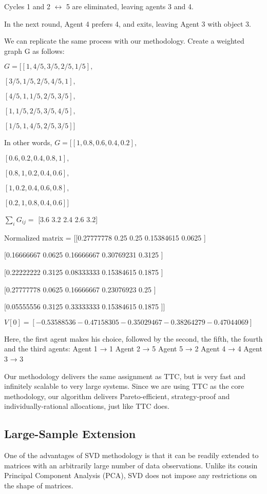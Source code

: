 Cycles 1 and 2 $\leftrightarrow$ 5 are eliminated, leaving agents 3 and 4.

In the next round, Agent 4 prefers 4, and exits, leaving Agent 3 with object 3. 


We can replicate the same process with our methodology. Create a weighted graph G as follows: 

$G = 	[[1, 4/5, 3/5, 2/5, 1/5],$

	$[3/5, 1/5, 2/5, 4/5, 1 ],$
 
	$[4/5, 1, 1/5, 2/5, 3/5 ],$
 
	$[1, 1/5, 2/5, 3/5, 4/5 ],$
 
	$[1/5, 1, 4/5, 2/5, 3/5 ]]$


In other words, 
$G = 	[[1, 0.8, 0.6, 0.4, 0.2],$

$[0.6, 0.2, 0.4, 0.8, 1], $

$[0.8, 1, 0.2, 0.4, 0.6], $

$[1, 0.2, 0.4, 0.6, 0.8], $

$[0.2, 1, 0.8, 0.4, 0.6]]$


$\sum_i G_{ij}= $  [3.6  3.2  2.4  2.6  3.2]

Normalized matrix =  [[0.27777778 0.25       0.25       0.15384615 0.0625    ]

 [0.16666667 0.0625     0.16666667 0.30769231 0.3125    ]

 [0.22222222 0.3125     0.08333333 0.15384615 0.1875    ]

 [0.27777778 0.0625     0.16666667 0.23076923 0.25      ]

 [0.05555556 0.3125     0.33333333 0.15384615 0.1875    ]]

$V[0] = [-0.53588536 -0.47158305 -0.35029467 -0.38264279 -0.47044069]$

Here, the first agent makes his choice, followed by the second, the fifth, the fourth and the third agents:
Agent 1 → 1
Agent 2 → 5
Agent 5 → 2
Agent 4 → 4
Agent 3 → 3

Our methodology delivers the same assignment as TTC, but is very fast and infinitely scalable to very large systems. Since we are using TTC as the core methodology, our algorithm delivers Pareto-efficient, strategy-proof and individually-rational allocations, just like TTC does. 

\subsection{Large-Sample Extension}
One of the advantages of SVD methodology is that it can be readily extended to matrices with an arbitrarily large number of data observations. Unlike its cousin Principal Component Analysis (PCA), SVD does not impose any restrictions on the shape of matrices. 

